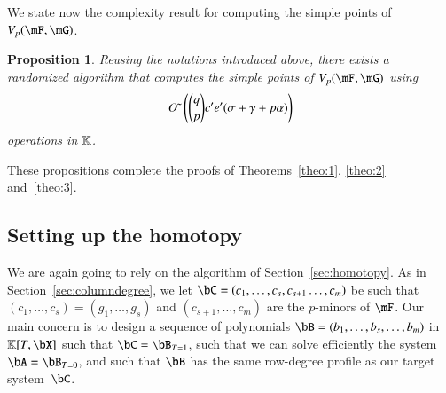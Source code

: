 \documentclass[amsthm]{elsart}
\newtheorem{proposition}[definition]{Proposition}
\begin{document}
We state now the complexity result for computing the simple
points of $\VpFG{p}{\mF}{\mG}$.

\begin{proposition}\label{prop:rowdegree_simple}
  Reusing the notations introduced above, there
  exists a randomized algorithm that computes the simple
  points of $\VpFG{p}{\mF}{\mG}$ using
  $${O}{\,\tilde{ }\,}\left({q \choose p} {c'}{} {e'}{} (\sigma + \gamma+ p \alpha)
  \right)$$ operations in $\mathbb{K}$.
\end{proposition}
These propositions complete the proofs of Theorems~\ref{theo:1},
\ref{theo:2} and~\ref{theo:3}. 


\subsection{Setting up the homotopy}

We are again going to rely on the algorithm of
Section~\ref{sec:homotopy}. As in Section~\ref{sec:columndegree}, we
let $\bC=(c_1,\dots,c_s,c_{s+1}\dots,c_m)$ be such that
$(c_1,\dots,c_s)=(g_1,\dots,g_s)$ and $(c_{s+1},\dots,c_m)$ are the
$p$-minors of $\mF$. Our main concern is to design a sequence of
polynomials $\bB=(b_1,\dots,b_s,\dots,b_m)$ in $\KK[T,\bX]$ such that
$\bC=\bB_{T=1}$, such that we can solve efficiently the system
$\bA=\bB_{T=0}$, and such that $\bB$ has the same row-degree profile
as our target system~$\bC$.
\end{document}
